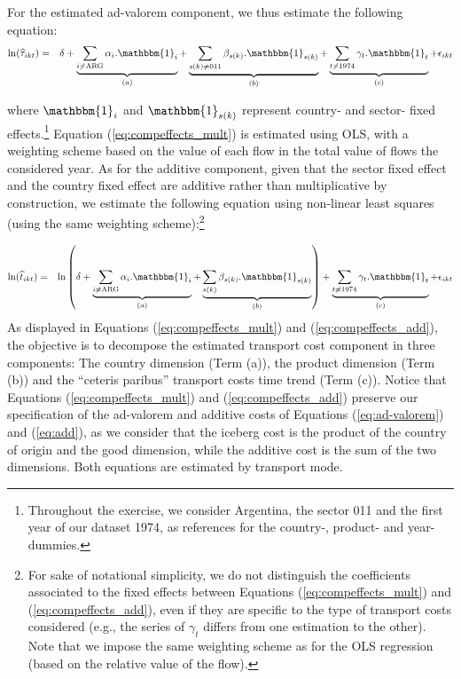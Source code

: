 \documentclass[a4paper,11pt]{article}
\begin{document}
For the estimated ad-valorem component, we thus estimate the following equation:
\begin{eqnarray}
\ln(\widehat{\tau}_{ikt})&=&\delta +\underbrace{\sum_{i \neq \text{ARG}}\alpha_i.\mathbbm{1}_i}_{(a)} + \underbrace{\sum_{s(k)\neq \text{011}}\beta_{s(k)}.\mathbbm{1}_{s(k)}}_{(b)} + \underbrace{\sum_{t \neq 1974}\gamma_t.\mathbbm{1}_t}_{(c)}+\epsilon_{ikt} \label{eq:compeffects_mult}
\end{eqnarray}

\noindent where $\mathbbm{1}_i$ and $\mathbbm{1}_{s(k)}$ represent country- and sector- fixed effects.\footnote{Throughout the exercise, we consider Argentina, the sector 011 and the first year of our dataset 1974, as references for the country-, product- and year- dummies.}  Equation (\ref{eq:compeffects_mult}) is estimated using OLS, with a weighting scheme based on the value of each flow in the total value of flows the considered year. As for the additive component, given that the sector fixed effect and the country fixed effect are additive rather than multiplicative by construction, we estimate the following equation using non-linear least squares (using the same weighting scheme):\footnote{For sake of notational simplicity, we do not distinguish the coefficients associated to the fixed effects between Equations (\ref{eq:compeffects_mult}) and (\ref{eq:compeffects_add}), even if they are specific to the type of transport costs considered (e.g., the series of $\gamma_t$ differs from one estimation to the other). Note that we impose the same weighting scheme as for the OLS regression (based on the relative value of the flow).}

\begin{eqnarray}
\ln(\widehat{t}_{ikt})&=&\ln\left( \delta + \underbrace{\sum_{i \neq \text{ARG}}  \alpha_i.\mathbbm{1}_i}_{(a)}+\underbrace{\sum_{s(k)}\beta_{s(k)}.\mathbbm{1}_{s(k)}}_{(b)}\right) + \underbrace{\sum_{t \neq 1974}\gamma_t.\mathbbm{1}_t}_{(c)}+\epsilon_{ikt} \label{eq:compeffects_add}
\end{eqnarray}
As displayed in Equations (\ref{eq:compeffects_mult}) and (\ref{eq:compeffects_add}), the objective is to decompose the estimated transport cost component in three components: The country dimension (Term (a)), the product dimension (Term (b)) and the ``ceteris paribus'' transport costs time trend (Term (c)). Notice that Equations (\ref{eq:compeffects_mult}) and (\ref{eq:compeffects_add}) preserve our specification of the ad-valorem and additive costs of Equations (\ref{eq:ad-valorem}) and (\ref{eq:add}), as we consider that the iceberg cost is the product of the country of origin and the good dimension, while the additive cost is the sum of the two dimensions. Both equations are estimated by transport mode.\smallskip
\end{document}
